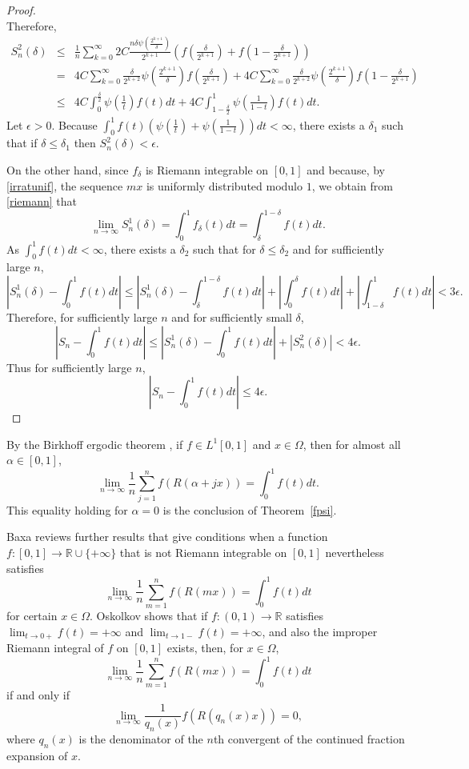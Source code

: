 \documentclass{article}
\begin{document}
\begin{proof}
\[\]
Therefore,
\begin{eqnarray*}
S_n^2(\delta)&\leq&\frac{1}{n}\sum_{k=0}^\infty  2C \frac{n\delta \psi\left( \frac{2^{k+1}}{\delta} \right)}{2^{k+1}} \left(f\left( \frac{\delta}{2^{k+1}} \right) + f\left(1-  \frac{\delta}{2^{k+1}} \right) \right)\\
&=&4C\sum_{k=0}^\infty  \frac{\delta}{2^{k+2}} \psi\left( \frac{2^{k+1}}{\delta} \right) f\left( \frac{\delta}{2^{k+1}} \right) 
+4C\sum_{k=0}^\infty \frac{\delta}{2^{k+2}} \psi\left( \frac{2^{k+1}}{\delta} \right) f\left(1-  \frac{\delta}{2^{k+1}} \right)\\
&\leq&4C\int_0^{\frac{\delta}{2}} \psi\left(\frac{1}{t}\right) f(t) dt + 4C\int_{1-\frac{\delta}{2}}^1 \psi\left(\frac{1}{1-t}\right) f(t) dt.
\end{eqnarray*}
Let $\epsilon>0$. Because $\int_0^1 f(t) \left( \psi\left(\frac{1}{t}\right)+\psi\left(\frac{1}{1-t}\right) \right) dt<\infty$, there exists a $\delta_1$ such that if
$\delta \leq \delta_1$ then $S_n^2(\delta)<\epsilon$.

On the other hand, since $f_\delta$ is Riemann integrable on $[0,1]$ and because, by \eqref{irratunif}, the sequence $mx$ is uniformly distributed modulo $1$, we obtain from
\eqref{riemann} that
\[
\lim_{n \to \infty} S_n^1(\delta)=\int_0^1 f_\delta(t) dt=\int_\delta^{1-\delta} f(t)dt.
\]
As $\int_0^1 f(t)dt < \infty$, there exists a $\delta_2$ such that for $\delta \leq \delta_2$ and for sufficiently large $n$,
\[
\left| S_n^1(\delta)-\int_0^1 f(t) dt\right| \leq \left|S_n^1(\delta) - \int_\delta^{1-\delta} f(t) dt \right| +
\left| \int_0^\delta f(t) dt \right| + \left| \int_{1-\delta}^1 f(t) dt \right| < 3\epsilon.
\]
Therefore, for sufficiently large $n$ and for sufficiently small $\delta$,
\[
\left|S_n - \int_0^1 f(t)dt \right| \leq \left|S_n^1(\delta) - \int_0^1 f(t)dt  \right| + \left|S_n^2(\delta) \right|
<
 4\epsilon.
\]
Thus for sufficiently large $n$,
\[
\left|S_n - \int_0^1 f(t)dt \right| \leq 4\epsilon.
\]
\end{proof}

By the Birkhoff ergodic theorem \cite[p.~44, Theorem~2.30]{einsiedler}, if $f \in L^1[0,1]$ and $x \in \Omega$, then for almost all
$\alpha \in [0,1]$,
\[
\lim_{n \to \infty} \frac{1}{n} \sum_{j=1}^n f(R(\alpha+jx))=\int_0^1 f(t) dt.
\]
This equality holding for $\alpha=0$ is the conclusion of Theorem~\ref{fpsi}. 

Baxa \cite{MR2189068} reviews further results that give conditions when a function $f:[0,1] \to \mathbb{R} \cup \{+\infty\}$ that is not Riemann integrable on $[0,1]$ nevertheless satisfies
\[
\lim_{n \to \infty} \frac{1}{n} \sum_{m=1}^n f(R(mx))= \int_0^1 f(t)dt
\]
for certain $x \in \Omega$. Oskolkov \cite[p.~170, Theorem~1]{MR1044053}  shows that if $f:(0,1) \to \mathbb{R}$ satisfies
$\lim_{t \to 0+} f(t)=+\infty$ and $\lim_{t \to 1-} f(t)=+\infty$, and also the improper Riemann integral of $f$ on $[0,1]$ exists, then, for $x \in \Omega$,
\[
\lim_{n \to \infty} \frac{1}{n} \sum_{m=1}^n f(R(mx))= \int_0^1 f(t)dt
\]
if and only if 
\[
\lim_{n \to \infty} \frac{1}{q_n(x)} f(R(q_n(x) x))=0,
\]
where $q_n(x)$ is the denominator of the $n$th convergent of the continued fraction expansion of $x$.
\end{document}
